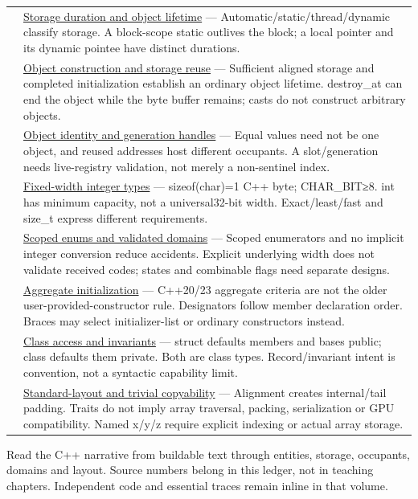 {\begin{longtable}[]{@{}
  >{\raggedright\arraybackslash}p{}
  >{\raggedright\arraybackslash}p{}@{}}
105 & \hyperref[appendix-0b104bcba06b]{Storage duration and object lifetime} --- Automatic/static/thread/dynamic classify storage. A block-scope static outlives the block; a local pointer and its dynamic pointee have distinct durations. \\
106 & \hyperref[appendix-a82f9c438857]{Object construction and storage reuse} --- Sufficient aligned storage and completed initialization establish an ordinary object lifetime. destroy\_at can end the object while the byte buffer remains; casts do not construct arbitrary objects. \\
107 & \hyperref[appendix-f1581457d322]{Object identity and generation handles} --- Equal values need not be one object, and reused addresses host different occupants. A slot/generation needs live-registry validation, not merely a non-sentinel index. \\
108 & \hyperref[appendix-cc04044b5782]{Fixed-width integer types} --- sizeof(char)=1 C++ byte; CHAR\_BIT≥8. int has minimum capacity, not a universal32-bit width. Exact/least/fast and size\_t express different requirements. \\
109 & \hyperref[appendix-23640fcee147]{Scoped enums and validated domains} --- Scoped enumerators and no implicit integer conversion reduce accidents. Explicit underlying width does not validate received codes; states and combinable flags need separate designs. \\
110 & \hyperref[appendix-b7174c179542]{Aggregate initialization} --- C++20/23 aggregate criteria are not the older user-provided-constructor rule. Designators follow member declaration order. Braces may select initializer-list or ordinary constructors instead. \\
111 & \hyperref[appendix-8e5214819615]{Class access and invariants} --- struct defaults members and bases public; class defaults them private. Both are class types. Record/invariant intent is convention, not a syntactic capability limit. \\
112 & \hyperref[appendix-958870a64c53]{Standard-layout and trivial copyability} --- Alignment creates internal/tail padding. Traits do not imply array traversal, packing, serialization or GPU compatibility. Named x/y/z require explicit indexing or actual array storage. \\
\end{longtable}
}

Read {the C++ narrative} from buildable text through entities, storage, occupants, domains and layout. Source numbers belong in this ledger, not in teaching chapters. Independent code and essential traces remain inline in that volume.

